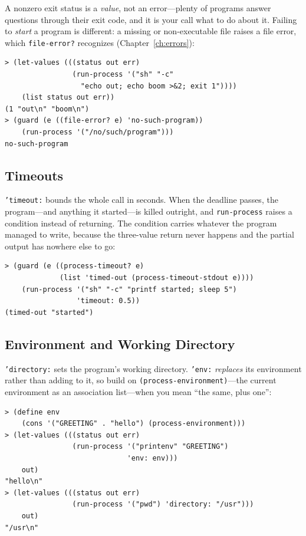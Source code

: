 A nonzero exit status is a \emph{value}, not an error---plenty of programs answer questions through their exit code, and it is your call what to do about it. Failing to \emph{start} a program is different: a missing or non-executable file raises a file error, which \texttt{file-error?} recognizes (Chapter~\ref{ch:errors}):

\begin{lstlisting}[style=repl]
> (let-values (((status out err)
                (run-process '("sh" "-c"
                  "echo out; echo boom >&2; exit 1"))))
    (list status out err))
(1 "out\n" "boom\n")
> (guard (e ((file-error? e) 'no-such-program))
    (run-process '("/no/such/program")))
no-such-program
\end{lstlisting}

\subsection{Timeouts}

\texttt{'timeout:} bounds the whole call in seconds. When the deadline passes, the program---and anything it started---is killed outright, and \texttt{run-process} raises a condition instead of returning. The condition carries whatever the program managed to write, because the three-value return never happens and the partial output has nowhere else to go:

\begin{lstlisting}[style=repl]
> (guard (e ((process-timeout? e)
             (list 'timed-out (process-timeout-stdout e))))
    (run-process '("sh" "-c" "printf started; sleep 5")
                 'timeout: 0.5))
(timed-out "started")
\end{lstlisting}

\subsection{Environment and Working Directory}

\texttt{'directory:} sets the program's working directory. \texttt{'env:} \emph{replaces} its environment rather than adding to it, so build on \texttt{(process-environment)}---the current environment as an association list---when you mean ``the same, plus one'':

\begin{lstlisting}[style=repl]
> (define env
    (cons '("GREETING" . "hello") (process-environment)))
> (let-values (((status out err)
                (run-process '("printenv" "GREETING")
                             'env: env)))
    out)
"hello\n"
> (let-values (((status out err)
                (run-process '("pwd") 'directory: "/usr")))
    out)
"/usr\n"
\end{lstlisting}

